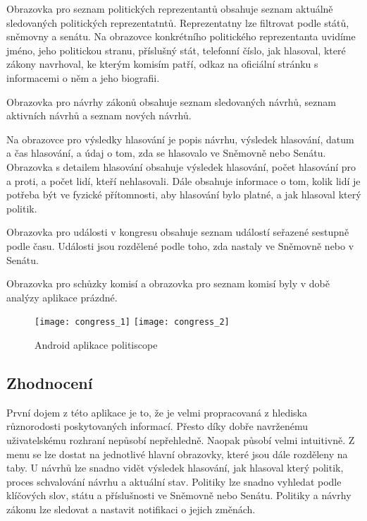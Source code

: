 Obrazovka pro seznam politických reprezentantů obsahuje seznam aktuálně sledovaných politických reprezentatntů. Reprezentatny lze filtrovat podle států, sněmovny a senátu. Na obrazovce konkrétního politického reprezentanta uvidíme jméno, jeho politickou stranu, příslušný stát, telefonní číslo, jak hlasoval, které zákony navrhoval, ke kterým komisím patří, odkaz na oficiální stránku s informacemi o něm a jeho biografii. 

Obrazovka pro návrhy zákonů obsahuje seznam sledovaných návrhů, seznam aktivních návrhů a seznam nových návrhů.

Na obrazovce pro výsledky hlasování je popis návrhu, výsledek hlasování, datum a čas hlasování, a údaj o tom, zda se hlasovalo ve Sněmovně nebo Senátu. Obrazovka s detailem hlasování obsahuje výsledek hlasování, počet hlasování pro a proti, a počet lidí, kteří nehlasovali. Dále obsahuje informace o tom, kolik lidí je potřeba být ve fyzické přítomnosti, aby hlasování bylo platné, a jak hlasoval který politik.

Obrazovka pro události v kongresu obsahuje seznam událostí seřazené sestupně podle času. Události jsou rozdělené podle toho, zda nastaly ve Sněmovně nebo v Senátu. 

Obrazovka pro schůzky komisí a obrazovka pro seznam komisí byly v době analýzy aplikace prázdné.
 
\begin{figure}
	\centering
	
	\texttt{[image: congress\_1]}
	\texttt{[image: congress\_2]}
	
	\caption{Android aplikace politiscope}
	\label{fig:politoscope}
\end{figure}

\subsection{Zhodnocení}
První dojem z této aplikace je to, že je velmi propracovaná z hlediska různorodosti poskytovaných informací. Přesto díky dobře navrženému uživatelskému rozhraní nepůsobí nepřehledně. Naopak působí velmi intuitivně. Z menu se lze dostat na jednotlivé hlavní obrazovky, které jsou dále rozděleny na taby. U návrhů lze snadno vidět výsledek hlasování, jak hlasoval který politik, proces schvalování návrhu a aktuální stav. Politiky lze snadno vyhledat podle klíčových slov, státu a příslušnosti ve Sněmovně nebo Senátu. Politiky a návrhy zákonu lze sledovat a nastavit notifikaci o jejich změnách.

